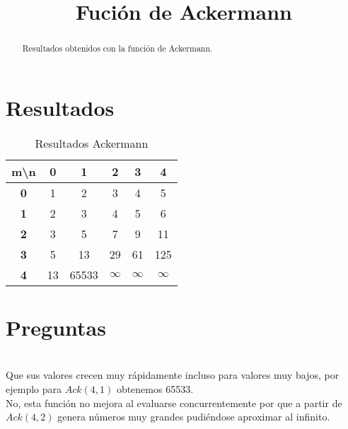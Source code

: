 
\title{Fución de Ackermann}

\maketitle
\begin{abstract}
    Resultados obtenidos con la función de Ackermann.
\end{abstract}
\section{Resultados}

\begin{table}[h]
    \centering
    \begin{tabular}{|c|c|c|c|c|c|}
        \hline
        \textbf{m\textbackslash n} & \textbf{0} & \textbf{1} & \textbf{2} & \textbf{3} & \textbf{4} \\ \hline
        \textbf{0} & 1 & 2 & 3 & 4 & 5 \\ \hline
        \textbf{1} & 2 & 3 & 4 & 5 & 6 \\ \hline
        \textbf{2} & 3 & 5 & 7 & 9 & 11 \\ \hline
        \textbf{3} & 5 & 13 & 29 & 61 & 125 \\ \hline
        \textbf{4} & 13 & 65533 & \textbf{$\infty$} & \textbf{$\infty$} & \textbf{$\infty$} \\ \hline
    \end{tabular}
    \caption{Resultados Ackermann}
    \label{table:Ack}
\end{table}
\section{Preguntas}
\\
Que sus valores crecen muy rápidamente incluso para valores muy bajos, por ejemplo para $Ack(4,1)$ obtenemos 65533.
\\
No, esta función no mejora al  evaluarse concurrentemente por que a partir de $Ack(4,2)$ genera números muy grandes pudiéndose aproximar al infinito.

